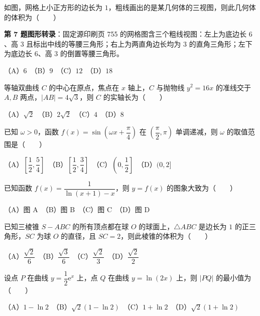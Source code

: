 \begin{question}
如图，网格上小正方形的边长为 $1$，粗线画出的是某几何体的三视图，则此几何体的体积为\mbox{（　　）}
\nopagebreak[4]
\begin{center}\end{center}
\nopagebreak[4]
\begin{gktip}
\textbf{第 7 题图形转录}：固定源印刷页 755 的网格图含三个粗线视图：左上为底边长 $6$、高 $3$ 且标出中线的等腰三角形；右上为两直角边长均为 $3$ 的直角三角形；左下为底边长 $6$、高 $3$ 的倒置等腰三角形。
\end{gktip}

（A）$6$　（B）$9$　（C）$12$　（D）$18$

\end{question}
\begin{question}
等轴双曲线 $C$ 的中心在原点，焦点在 $x$ 轴上，$C$ 与抛物线 $y^2=16x$ 的准线交于 $A,B$ 两点，$|AB|=4\sqrt3$，则 $C$ 的实轴长为\mbox{（　　）}

（A）$\sqrt2$　（B）$2\sqrt2$　（C）$4$　（D）$8$

\end{question}
\begin{question}
已知 $\omega>0$，函数 $f(x)=\sin\left(\omega x+\dfrac{\pi}{4}\right)$ 在 $\left(\dfrac{\pi}{2},\pi\right)$ 单调递减，则 $\omega$ 的取值范围是\mbox{（　　）}

（A）$\left[\dfrac12,\dfrac54\right]$　（B）$\left[\dfrac12,\dfrac34\right]$　（C）$\left(0,\dfrac12\right]$　（D）$(0,2]$

\Needspace{0.4\textheight}
\end{question}
\begin{question}
已知函数 $f(x)=\dfrac{1}{\ln(x+1)-x}$，则 $y=f(x)$ 的图象大致为\mbox{（　　）}
\nopagebreak[4]
\begin{center}\end{center}
\nopagebreak[4]
（A）图 A　（B）图 B　（C）图 C　（D）图 D

\end{question}
\begin{question}
已知三棱锥 $S-ABC$ 的所有顶点都在球 $O$ 的球面上，$\triangle ABC$ 是边长为 $1$ 的正三角形，$SC$ 为球 $O$ 的直径，且 $SC=2$，则此棱锥的体积为\mbox{（　　）}

（A）$\dfrac{\sqrt2}{6}$　（B）$\dfrac{\sqrt3}{6}$　（C）$\dfrac{\sqrt2}{3}$　（D）$\dfrac{\sqrt2}{2}$

\end{question}
\begin{question}
设点 $P$ 在曲线 $y=\dfrac12\mathrm e^x$ 上，点 $Q$ 在曲线 $y=\ln(2x)$ 上，则 $|PQ|$ 的最小值为\mbox{（　　）}

（A）$1-\ln2$　（B）$\sqrt2(1-\ln2)$　（C）$1+\ln2$　（D）$\sqrt2(1+\ln2)$

\end{question}

